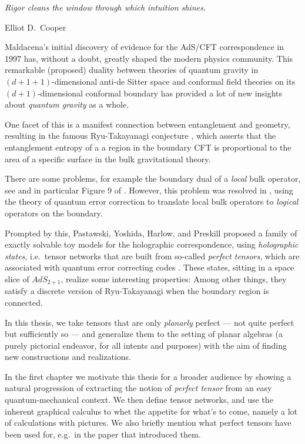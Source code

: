 \setlength{\epigraphwidth}{0.61\textwidth}
\epigraph{\textit{Rigor cleans the window through which intuition shines.}}{Elliot D.\ Cooper\footnotemark} 

\noindent 
Maldacena's initial discovery \cite{maldacena1999large} of evidence for the AdS/CFT correspondence in 1997 has, without a doubt, greatly shaped the modern physics community.
This remarkable (proposed) duality between theories of quantum gravity in $(d+1+1)$-dimensional anti-de Sitter space and conformal field theories on its $(d+1)$-dimensional conformal boundary has provided a lot of new insights about \emph{quantum gravity} as a whole. 

One facet of this is a manifest connection between entanglement and geometry, resulting in the famous Ryu-Takayanagi conjecture \cite{ryu2006holographic}, which asserts that the entanglement entropy of a a region in the boundary CFT is proportional to the area of a specific surface in the bulk gravitational theory.

There are some problems, for example the boundary dual of a \emph{local} bulk operator, see  \cite{Pastawski2015Holographic} and in particular Figure 9 of \cite{almheiri2015bulk}. However, this problem was resolved in \cite{almheiri2015bulk}, using the theory of quantum error correction to translate local bulk operators to \emph{logical} operators on the boundary. 

Prompted by this, Pastawski, Yoshida, Harlow, and Preskill \cite{Pastawski2015Holographic} proposed a family of exactly solvable toy models for the holographic correspondence, using \emph{holographic states}, i.e.\ tensor networks that are built from so-called \emph{perfect tensors}, which are associated with quantum error correcting codes \cite{raissi2017constructingQECC}. These states, sitting in a space slice of $AdS_{2+1}$, realize some interesting properties: Among other things, they satisfy a discrete version of Ryu-Takayanagi when the boundary region is connected.

In this thesis, we take tensors that are only \emph{planarly} perfect --- not quite perfect but sufficiently so --- and generalize them to the setting of planar algebras (a purely pictorial endeavor, for all intents and purposes) with the aim of finding new constructions and realizations.

\bigskip
In the first chapter we motivate this thesis for a broader audience by showing a natural progression of extracting the notion of \emph{perfect tensor} from an easy quantum-mechanical context. We then define tensor networks, and use the inherent graphical calculus to whet the appetite for what's to come, namely a lot of calculations with pictures. We also briefly mention what perfect tensors have been used for, e.g.\ in the paper \cite{Pastawski2015Holographic} that introduced them.

